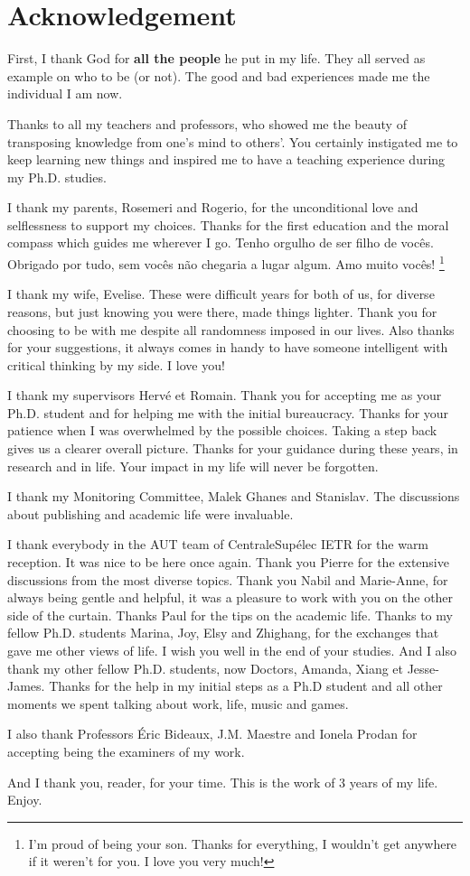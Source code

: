 \documentclass[../main.tex]{subfiles}
\begin{document}
\chapter*{Acknowledgement}

First, I thank God for \textbf{all the people} he put in my life.
They all served as example on who to be (or not).
The good and bad experiences made me the individual I am now.

Thanks to all my teachers and professors, who showed me the beauty of transposing knowledge from one's mind to others'.
You certainly instigated me to keep learning new things and inspired me to have a teaching experience during my Ph.D. studies.

I thank my parents, Rosemeri and Rogerio, for the unconditional love and selflessness to support my choices.
Thanks for the first education and the moral compass which guides me wherever I go. Tenho orgulho de ser filho de vocês. Obrigado por tudo, sem vocês não chegaria a lugar algum. Amo muito vocês! \footnote{I'm proud of being your son. Thanks for everything, I wouldn't get anywhere if it weren't for you. I love you very much!}

I thank my wife, Evelise.
These were difficult years for both of us, for diverse reasons, but just knowing you were there, made things lighter.
Thank you for choosing to be with me despite all randomness imposed in our lives.
Also thanks for your suggestions, it always comes in handy to have someone intelligent with critical thinking by my side.
I love you!

I thank my supervisors Hervé et Romain.
Thank you for accepting me as your Ph.D. student and for helping me with the initial bureaucracy.
Thanks for your patience when I was overwhelmed by the possible choices.
Taking a step back gives us a clearer overall picture.
Thanks for your guidance during these years, in research and in life.
Your impact in my life will never be forgotten.

I thank my Monitoring Committee, Malek Ghanes and Stanislav.
The discussions about publishing and academic life were invaluable.

I thank everybody in the AUT team of CentraleSupélec IETR for the warm reception.
It was nice to be here once again.
Thank you Pierre for the extensive discussions from the most diverse topics.
Thank you Nabil and Marie-Anne, for always being gentle and helpful, it was a pleasure to work with you on the other side of the curtain.
Thanks Paul for the tips on the academic life.
Thanks to my fellow Ph.D. students Marina, Joy, Elsy and Zhighang, for the exchanges that gave me other views of life.
I wish you well in the end of your studies.
And I also thank my other fellow Ph.D. students, now Doctors, Amanda, Xiang et Jesse-James.
Thanks for the help in my initial steps as a Ph.D student and all other moments we spent talking about work, life, music and games.

I also thank Professors Éric Bideaux, J.M. Maestre and Ionela Prodan for accepting being the examiners of my work.

And I thank you, reader, for your time. This is the work of 3 years of my life. Enjoy.
\end{document}
